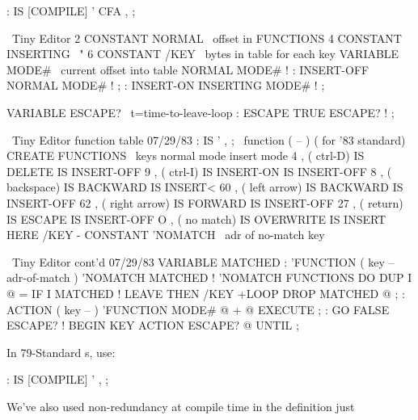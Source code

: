 \begin{Code}
: IS   [COMPILE] '  CFA , ;
\end{Code}
\begin{figure*}[tttp]
\setcounter{screen}{30}
\begin{Screen}
\ Tiny Editor
2 CONSTANT NORMAL     \ offset in FUNCTIONS
4 CONSTANT INSERTING  \        "
6 CONSTANT /KEY       \ bytes in table for each key
VARIABLE MODE#        \ current offset into table
NORMAL MODE# !
: INSERT-OFF   NORMAL    MODE# ! ;
: INSERT-ON    INSERTING MODE# ! ;

VARIABLE ESCAPE?      \ t=time-to-leave-loop
: ESCAPE  TRUE ESCAPE? ! ;





\end{Screen}
\begin{Screen}
\ Tiny Editor             function table             07/29/83
: IS   ' , ;  \   function   ( -- )    ( for '83 standard)
CREATE FUNCTIONS
\ keys                  normal mode        insert mode
 4 ,  ( ctrl-D)         IS DELETE          IS INSERT-OFF
 9 ,  ( ctrl-I)         IS INSERT-ON       IS INSERT-OFF
 8 ,  ( backspace)      IS BACKWARD        IS INSERT<
60 ,  ( left arrow)     IS BACKWARD        IS INSERT-OFF
62 ,  ( right arrow)    IS FORWARD         IS INSERT-OFF
27 ,  ( return)         IS ESCAPE          IS INSERT-OFF
 O ,  ( no match)       IS OVERWRITE       IS INSERT
HERE /KEY -  CONSTANT 'NOMATCH  \ adr of no-match key




\end{Screen}
\begin{Screen}
\ Tiny Editor cont'd                                 07/29/83
VARIABLE MATCHED
: 'FUNCTION  ( key -- adr-of-match )  'NOMATCH  MATCHED !
   'NOMATCH FUNCTIONS DO  DUP  I @ =  IF
     I MATCHED !  LEAVE  THEN  /KEY +LOOP  DROP
    MATCHED @ ;
: ACTION  ( key -- )  'FUNCTION  MODE# @ +  @ EXECUTE ;
: GO   FALSE ESCAPE? !  BEGIN  KEY ACTION  ESCAPE? @ UNTIL ;








\end{Screen}
\end{figure*}
In 79-Standard \Forth{}s, use:
\begin{Code}
: IS   [COMPILE] '  , ;
\end{Code}
We've also used non-redundancy at compile time in the definition just
